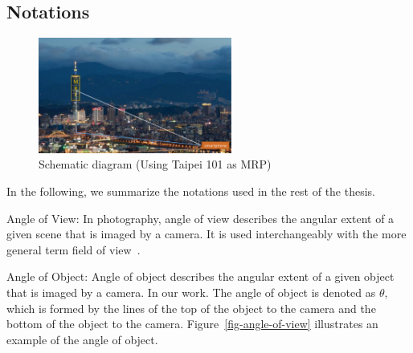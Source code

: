 \subsection{Notations}
\begin{figure}
  \vspace{-50pt}
  \begin{center}
    \includegraphics[width=2.5in]{fig/fig-taipei101.eps}
  \end{center}
  \vspace{-20pt}
  \caption{Schematic diagram (Using Taipei 101 as MRP)}\label{fig-taipei101}
  \vspace{-35pt}
\end{figure}
In the following, we summarize the notations used in the rest of the thesis.
\begin{mydef}
Angle of View: In photography, angle of view describes the angular extent of a given scene that is imaged by a camera. It is used interchangeably with the more general term field of view~\cite{wiki-angle-of-view}.
\end{mydef}
\begin{mydef}
Angle of Object: Angle of object describes the angular extent of a given object that is imaged by a camera. In our work. The angle of object is denoted as $\theta$, which is formed by the lines of the top of the object to the camera and the bottom of the object to the camera. Figure~\ref{fig-angle-of-view} illustrates an example of the angle of object.
\end{mydef}

